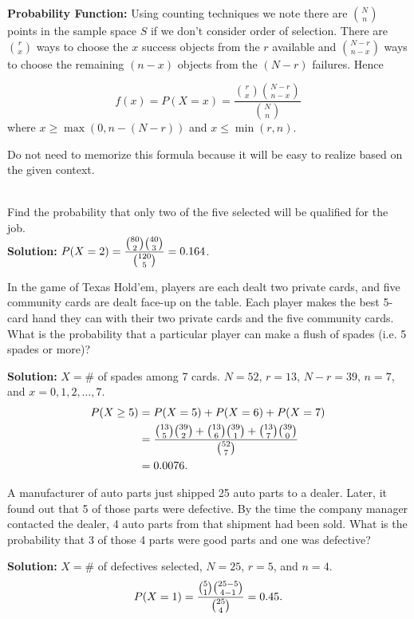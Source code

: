 \textbf{Probability Function:} Using counting techniques we note there are \(\binom{N}{n}\) points in the sample space
\(S\) if we don't consider order of selection. There are \(\binom{r}{x}\) ways to choose the \(x\) success objects from the
\(r\) available and \(\binom{N-r}{n-x}\) ways to choose the remaining \((n - x)\) objects from the \((N - r)\) failures. Hence

\[
    f(x) = P(X = x) = \frac{\binom{r}{x} \binom{N-r}{n-x}}{\binom{N}{n}}
\]
where $x \geq \operatorname{max}(0,n-(N-r))$ and $x \leq \operatorname{min}(r,n)$.

\begin{note}
    Do not need to memorize this formula because it will be easy to realize based on the given context.
\end{note}

\begin{example}
    \phantom{}\\
    Find the probability that only two of the five selected will be qualified for the job. \vspace{2mm} \\ 
    \textbf{Solution:} $P(X = 2) = \displaystyle \frac{\binom{80}{2} \binom{40}{3}}{\binom{120}{5}} = 0.164$.
\end{example}

\begin{example}
    In the game of Texas Hold'em, players are each dealt two private cards, and five community cards are dealt face-up on the table.
    Each player makes the best 5-card hand they can with their two private cards and the five community cards.
    What is the probability that a particular player can make a flush of spades (i.e. 5 spades or more)?

    \textbf{Solution:} $X = \#$ of spades among 7 cards. $N = 52$, $r = 13$, $N-r = 39$, $n = 7$, and $x = 0,1,2,\ldots ,7$. \vspace{-4mm}
    \begin{align*}
        P(X \geq 5) &= P(X=5)+ P(X=6) + P(X=7) \\
        &= \displaystyle \frac{\binom{13}{5}\binom{39}{2} + \binom{13}{6}\binom{39}{1} + \binom{13}{7}\binom{39}{0}}{\binom{52}{7}} \\
        &= 0.0076.
    \end{align*}
\end{example}

\begin{example}
    A manufacturer of auto parts just shipped 25 auto parts to a dealer. Later, it found out that 5 of those parts were defective. By the time the company
    manager contacted the dealer, 4 auto parts from that shipment had been sold. What is the probability that 3 of those 4 parts were good parts and one was defective?

    \textbf{Solution:} $X = \#$ of defectives selected, $N = 25$, $r = 5$, and $n = 4$. \vspace{-3mm}
    \[
        P(X = 1) = \displaystyle \frac{\binom{5}{1}\binom{25-5}{4-1}}{\binom{25}{4}} = 0.45.
    \]
\end{example}


